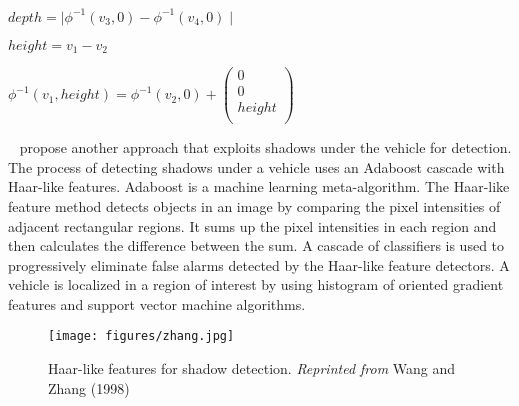 \documentclass[a4paper]{aitthesis}
\begin{document}
\begin{center}
$ depth = \mid \phi ^ {-1}(v_3, 0) - \phi^{-1}(v_4, 0) \mid $
\end{center}

\begin{center}
$height = v_1 - v_2$
\end{center}

\begin{center}
$\phi^{-1}(v_1, height) = \phi ^{-1}(v_2, 0) + 
 \begin{pmatrix}
 0 \\
  0  \\
   height\\
   
 \end{pmatrix}
 $
\end{center}

~\noindent {} propose another approach that exploits shadows under the vehicle for detection. The process of detecting  shadows under a vehicle uses an Adaboost cascade with Haar-like features. Adaboost is a machine learning meta-algorithm. The Haar-like feature method detects objects in an image by comparing the pixel intensities of adjacent rectangular regions. It sums up the pixel intensities in each region and then calculates the difference between the sum. A cascade of classifiers is used to progressively eliminate false alarms detected by the Haar-like feature detectors. A vehicle is localized in a region of interest by using histogram of oriented gradient features and support vector machine algorithms.
\begin{figure}[h]
    \centering
    \texttt{[image: figures/zhang.jpg]}
    \caption{Haar-like features for shadow detection.\emph{ Reprinted from} Wang and Zhang (1998)} 
    \label{fig:cap1}
\end{figure}
\end{document}
